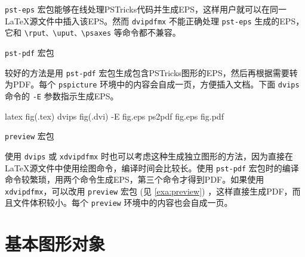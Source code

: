  \texttt{pst-eps} 宏包能够在线处理PSTricks代码并生成EPS，这样用户就可以在同一 \LaTeX 源文件中插入该EPS。然而 \texttt{dvipdfmx} 不能正确处理 \texttt{pst-eps} 生成的EPS，它和 \verb|\rput、\uput、\psaxes| 等命令都不兼容。

\begin{example}[h]
\caption{ \texttt{pst-pdf} 宏包}
\label{exa:pst-pdf}
\end{example}

较好的方法是用 \texttt{pst-pdf} 宏包生成包含PSTricks图形的EPS，然后再根据需要转为PDF。每个 \texttt{pspicture} 环境中的内容会自成一页，方便插入文档。下面 \texttt{dvips} 命令的 \texttt{-E} 参数指示生成EPS。

\begin{Code}[]
latex fig(.tex)
dvips fig(.dvi) -E fig.eps
ps2pdf fig.eps fig.pdf
\end{Code}

\begin{example}[h]
\caption{ \texttt{preview} 宏包}
\label{exa:preview}
\end{example}

使用 \texttt{dvips} 或 \texttt{xdvipdfmx} 时也可以考虑这种生成独立图形的方法，因为直接在 \LaTeX 源文件中使用绘图命令，编译时间会比较长。使用 \texttt{pst-pdf} 宏包时的编译命令较繁琐，用两个命令生成EPS，第三个命令才得到PDF。如果使用 \texttt{xdvipdfmx}，可以改用 \texttt{preview} 宏包 (见 \autoref{exa:preview}) ，这样直接生成PDF，而且文件体积较小。每个 \texttt{preview} 环境中的内容也会自成一页。

\section{基本图形对象}
